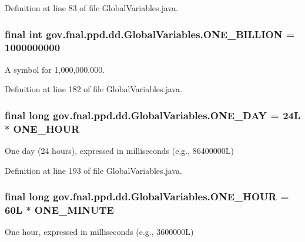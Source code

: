 Definition at line 83 of file Global\-Variables.\-java.

\hypertarget{classgov_1_1fnal_1_1ppd_1_1dd_1_1GlobalVariables_a271c983add4bac415412025c8ac2f4cc}{
\subsubsection[{O\-N\-E\-\_\-\-B\-I\-L\-L\-I\-O\-N}]{\setlength{\rightskip}{0pt plus 5cm}final int gov.\-fnal.\-ppd.\-dd.\-Global\-Variables.\-O\-N\-E\-\_\-\-B\-I\-L\-L\-I\-O\-N = 1000000000\hspace{0.3cm}{\ttfamily [static]}}}\label{classgov_1_1fnal_1_1ppd_1_1dd_1_1GlobalVariables_a271c983add4bac415412025c8ac2f4cc}
A symbol for 1,000,000,000. 

Definition at line 182 of file Global\-Variables.\-java.

\hypertarget{classgov_1_1fnal_1_1ppd_1_1dd_1_1GlobalVariables_aef5cbdf53c9830ae609987b805a08998}{
\subsubsection[{O\-N\-E\-\_\-\-D\-A\-Y}]{\setlength{\rightskip}{0pt plus 5cm}final long gov.\-fnal.\-ppd.\-dd.\-Global\-Variables.\-O\-N\-E\-\_\-\-D\-A\-Y = 24\-L $\ast$ O\-N\-E\-\_\-\-H\-O\-U\-R\hspace{0.3cm}{\ttfamily [static]}}}\label{classgov_1_1fnal_1_1ppd_1_1dd_1_1GlobalVariables_aef5cbdf53c9830ae609987b805a08998}
One day (24 hours), expressed in milliseconds (e.\-g., 86400000\-L) 

Definition at line 193 of file Global\-Variables.\-java.

\hypertarget{classgov_1_1fnal_1_1ppd_1_1dd_1_1GlobalVariables_a947f75994e24bb52604adf3699920579}{
\subsubsection[{O\-N\-E\-\_\-\-H\-O\-U\-R}]{\setlength{\rightskip}{0pt plus 5cm}final long gov.\-fnal.\-ppd.\-dd.\-Global\-Variables.\-O\-N\-E\-\_\-\-H\-O\-U\-R = 60\-L $\ast$ O\-N\-E\-\_\-\-M\-I\-N\-U\-T\-E\hspace{0.3cm}{\ttfamily [static]}}}\label{classgov_1_1fnal_1_1ppd_1_1dd_1_1GlobalVariables_a947f75994e24bb52604adf3699920579}
One hour, expressed in milliseconds (e.\-g., 3600000\-L) 

